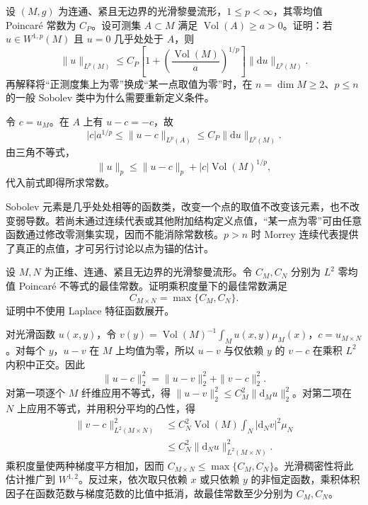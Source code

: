 \begin{exercise}\label{g3:ex:poincare-positive-measure-anchor}
	设 \((M,g)\) 为连通、紧且无边界的光滑黎曼流形，\(1\le p<\infty\)，其零均值 Poincaré 常数为 \(C_P\)。设可测集 \(A\subset M\) 满足 \(\operatorname{Vol}(A)\ge a>0\)。证明：若 \(u\in W^{1,p}(M)\) 且 \(u=0\) 几乎处处于 \(A\)，则
	\[
		\|u\|_{L^p(M)}\le C_P\left[1+\left(\frac{\operatorname{Vol}(M)}a\right)^{1/p}\right]\|\mathrm du\|_{L^p(M)}.
	\]
	再解释将“正测度集上为零”换成“某一点取值为零”时，在 \(n=\dim M\ge2\)、\(p\le n\) 的一般 Sobolev 类中为什么需要重新定义条件。
\end{exercise}
\begin{solution}
	令 \(c=u_M\)。在 \(A\) 上有 \(u-c=-c\)，故
	\[
		|c|a^{1/p}\le\|u-c\|_{L^p(A)}\le C_P\|\mathrm du\|_{L^p(M)}.
	\]
	由三角不等式，
	\[
		\|u\|_p\le\|u-c\|_p+|c|\operatorname{Vol}(M)^{1/p},
	\]
	代入前式即得所求常数。

	Sobolev 元素是几乎处处相等的函数类，改变一个点的取值不改变该元素，也不改变弱导数。若尚未通过连续代表或其他附加结构定义点值，“某一点为零”可由任意函数通过修改零测集实现，因而不能消除常数核。\(p>n\) 时 Morrey 连续代表提供了真正的点值，才可另行讨论以点为锚的估计。
\end{solution}

\begin{exercise}\label{g3:ex:product-poincare-optimal}
	设 \(M,N\) 为正维、连通、紧且无边界的光滑黎曼流形。令 \(C_M,C_N\) 分别为 \(L^2\) 零均值 Poincaré 不等式的最佳常数。证明乘积度量下的最佳常数满足
	\[
		C_{M\times N}=\max\{C_M,C_N\}.
	\]
	证明中不使用 Laplace 特征函数展开。
\end{exercise}
\begin{solution}
	对光滑函数 \(u(x,y)\)，令 \(v(y)=\operatorname{Vol}(M)^{-1}\int_Mu(x,y)\mu_M(x)\)，\(c=u_{M\times N}\)。对每个 \(y\)，\(u-v\) 在 \(M\) 上均值为零，所以 \(u-v\) 与仅依赖 \(y\) 的 \(v-c\) 在乘积 \(L^2\) 内积中正交。因此
	\[
		\|u-c\|_2^2=\|u-v\|_2^2+\|v-c\|_2^2.
	\]
	对第一项逐个 \(M\) 纤维应用不等式，得 \(\|u-v\|_2^2\le C_M^2\|\mathrm d_Mu\|_2^2\)。对第二项在 \(N\) 上应用不等式，并用积分平均的凸性，得
	\[
	\begin{aligned}
		\|v-c\|_{L^2(M\times N)}^2
		&\le C_N^2\operatorname{Vol}(M)\int_N|\mathrm d_Nv|^2\mu_N\\
		&\le C_N^2\|\mathrm d_Nu\|_{L^2(M\times N)}^2.
	\end{aligned}
	\]
	乘积度量使两种梯度平方相加，因而 \(C_{M\times N}\le\max\{C_M,C_N\}\)。光滑稠密性将此估计推广到 \(W^{1,2}\)。反过来，依次取只依赖 \(x\) 或只依赖 \(y\) 的非恒定函数，乘积体积因子在函数范数与梯度范数的比值中抵消，故最佳常数至少分别为 \(C_M,C_N\)。
\end{solution}

